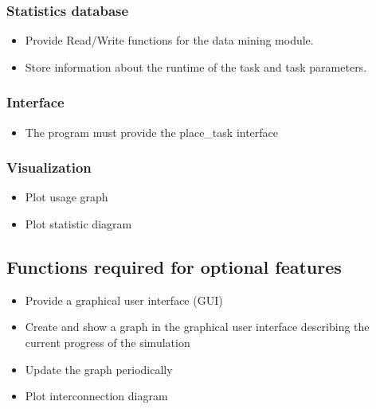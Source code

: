 {		\subsubsection{Statistics database}
	
			\begin{itemize}
				\item Provide Read/Write functions for the data mining module.
				\item Store information about the runtime of the task and task parameters.
			\end{itemize}
	
	
	\subsubsection{Interface}
		\begin{itemize}
		
			\item The program must provide the place\_task interface
		\end{itemize}
		
		
	\subsubsection{Visualization}
	
		\begin{itemize}
			\item Plot usage graph
			\item Plot statistic diagram
		\end{itemize}
		
	\subsection{Functions required for optional features}
	
		\begin{itemize}
			\item Provide a graphical user interface (GUI)
			\item Create and show a graph in the graphical user interface describing the current progress of the simulation
			\item Update the graph periodically
			\item Plot interconnection diagram
		
		\end{itemize}
		
}

